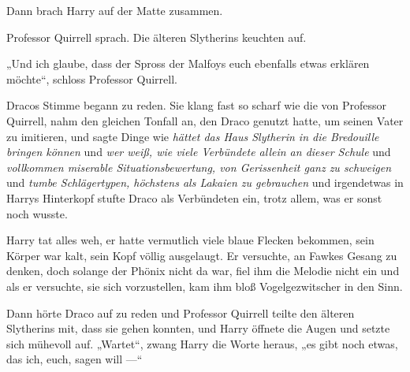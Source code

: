 Dann brach Harry auf der Matte zusammen.

Professor Quirrell sprach. Die älteren Slytherins keuchten auf.

„Und ich glaube, dass der Spross der Malfoys euch ebenfalls etwas erklären möchte“, schloss Professor Quirrell.

Dracos Stimme begann zu reden. Sie klang fast so scharf wie die von Professor Quirrell, nahm den gleichen Tonfall an, den Draco genutzt hatte, um seinen Vater zu imitieren, und sagte Dinge wie \emph{hättet das Haus Slytherin in die Bredouille bringen können} und \emph{wer weiß, wie viele Verbündete allein an dieser Schule} und \emph{vollkommen miserable Situationsbewertung, von Gerissenheit ganz zu schweigen} und \emph{tumbe Schlägertypen, höchstens als Lakaien zu gebrauchen} und irgendetwas in Harrys Hinterkopf stufte Draco als Verbündeten ein, trotz allem, was er sonst noch wusste.

Harry tat alles weh, er hatte vermutlich viele blaue Flecken bekommen, sein Körper war kalt, sein Kopf völlig ausgelaugt. Er versuchte, an Fawkes Gesang zu denken, doch solange der Phönix nicht da war, fiel ihm die Melodie nicht ein und als er versuchte, sie sich vorzustellen, kam ihm bloß Vogelgezwitscher in den Sinn.

Dann hörte Draco auf zu reden und Professor Quirrell teilte den älteren Slytherins mit, dass sie gehen konnten, und Harry öffnete die Augen und setzte sich mühevoll auf.
„Wartet“, zwang Harry die Worte heraus, „es gibt noch etwas, das ich, euch, sagen will —“

